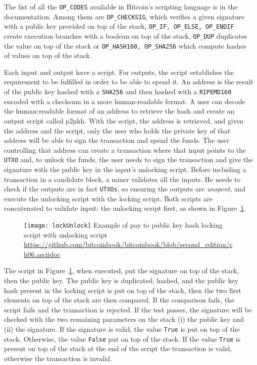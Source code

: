 The list of all the \texttt{OP\_CODES} available in Bitcoin's scripting language
is in the documentation. Among them are \texttt{OP\_CHECKSIG}, which verifies a given
signature with a public key provided on top of the stack, \texttt{OP\_IF, OP\_ELSE,
OP\_ENDIF} create execution branches with a boolean on top of the stack,
\texttt{OP\_DUP} duplicates the value on top of the stack or \texttt{OP\_HASH160,
OP\_SHA256} which compute hashes of values on top of the stack.

Each input and output have a script. For outputs, the script establishes the
requirement to be fulfilled in order to be able to spend it. An address is the result
of the public key hashed with a \texttt{SHA256} and then hashed with a
\texttt{RIPEMD160} encoded with a checksum in a more human-readable format. A
user can decode the human-readable format of an address to retrieve the hash
and create an output script called \gls{p2pkh}. With the script, the
address is retrieved, and given the address and the script, only the user who
holds the private key of that address will be able to sign the transaction and
spend the funds. The user controlling that address can create a transaction where that
input points to the \texttt{UTXO} and, to unlock the funds, the user needs to sign
the transaction and give the signature with the public key in the input's
unlocking script. Before including a transaction in a candidate block, a miner
validates all the inputs. He needs to check if the outputs are in fact
\texttt{UTXOs}, so ensuring the outputs are \textit{unspent}, and execute the
unlocking script with the locking script. Both scripts are concatenated to
validate input; the unlocking script first, as shown in
Figure~\ref{fig:lockUnlock}.

\begin{figure}[H]
	\centering
	\texttt{[image: lockUnlock]}
  {Example of pay to public key hash locking script with unlocking script}
	{\url{https://github.com/bitcoinbook/bitcoinbook/blob/second_edition/ch06.asciidoc}}
	\label{fig:lockUnlock}
\end{figure}

The script in Figure~\ref{fig:lockUnlock}, when executed, put the signature on
top of the stack, then the public key. The public key is duplicated, hashed,
and the public key hash present in the locking script is put on top of the stack,
then the two first elements on top of the stack are then compared. If the
comparison fails, the script fails and the transaction is rejected. If the
test passes, the signature will be checked with the two remaining parameters on
the stack (i) the public key and (ii) the signature. If the signature is valid, the
value \texttt{True} is put on top of the stack. Otherwise, the
value \texttt{False} put on top of the stack. If the value \texttt{True} is present
on top of the stack at the end of the script the transaction is valid,
otherwise the transaction is invalid.

